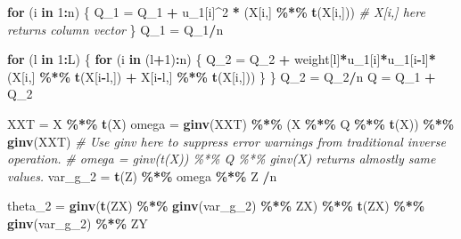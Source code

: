 \documentclass[
  12pt,
]{article}
\newenvironment{Shaded}{\begin{snugshade}}{\end{snugshade}}
\newcommand{\CommentTok}[1]{\textcolor[rgb]{0.56,0.35,0.01}{\textit{#1}}}
\newcommand{\ControlFlowTok}[1]{\textcolor[rgb]{0.13,0.29,0.53}{\textbf{#1}}}
\newcommand{\DecValTok}[1]{\textcolor[rgb]{0.00,0.00,0.81}{#1}}
\newcommand{\KeywordTok}[1]{\textcolor[rgb]{0.13,0.29,0.53}{\textbf{#1}}}
\newcommand{\NormalTok}[1]{#1}
\newcommand{\OperatorTok}[1]{\textcolor[rgb]{0.81,0.36,0.00}{\textbf{#1}}}
\newcommand{\StringTok}[1]{\textcolor[rgb]{0.31,0.60,0.02}{#1}}
\begin{document}
\begin{Shaded}
\begin{Highlighting}[]
\ControlFlowTok{for}\NormalTok{ (i }\ControlFlowTok{in} \DecValTok{1}\OperatorTok{:}\NormalTok{n) \{}
\NormalTok{    Q\_}\DecValTok{1}\NormalTok{ =}\StringTok{ }\NormalTok{Q\_}\DecValTok{1} \OperatorTok{+}\StringTok{ }\NormalTok{u\_}\DecValTok{1}\NormalTok{[i]}\OperatorTok{\^{}}\DecValTok{2} \OperatorTok{*}\StringTok{ }\NormalTok{(X[i,] }\OperatorTok{\%*\%}\StringTok{ }\KeywordTok{t}\NormalTok{(X[i,])) }\CommentTok{\# X[i,] here returns column vector}
\NormalTok{\}}
\NormalTok{Q\_}\DecValTok{1}\NormalTok{ =}\StringTok{ }\NormalTok{Q\_}\DecValTok{1}\OperatorTok{/}\NormalTok{n}

\ControlFlowTok{for}\NormalTok{ (l }\ControlFlowTok{in} \DecValTok{1}\OperatorTok{:}\NormalTok{L) \{}
    \ControlFlowTok{for}\NormalTok{ (i }\ControlFlowTok{in}\NormalTok{ (l}\OperatorTok{+}\DecValTok{1}\NormalTok{)}\OperatorTok{:}\NormalTok{n) \{}
\NormalTok{        Q\_}\DecValTok{2}\NormalTok{ =}\StringTok{ }\NormalTok{Q\_}\DecValTok{2} \OperatorTok{+}\StringTok{ }\NormalTok{weight[l]}\OperatorTok{*}\NormalTok{u\_}\DecValTok{1}\NormalTok{[i]}\OperatorTok{*}\NormalTok{u\_}\DecValTok{1}\NormalTok{[i}\OperatorTok{{-}}\NormalTok{l]}\OperatorTok{*}
\StringTok{        }\NormalTok{(X[i,] }\OperatorTok{\%*\%}\StringTok{ }\KeywordTok{t}\NormalTok{(X[i}\OperatorTok{{-}}\NormalTok{l,]) }\OperatorTok{+}\StringTok{ }\NormalTok{X[i}\OperatorTok{{-}}\NormalTok{l,] }\OperatorTok{\%*\%}\StringTok{ }\KeywordTok{t}\NormalTok{(X[i,]))}
\NormalTok{    \}}
\NormalTok{\}}
\NormalTok{Q\_}\DecValTok{2}\NormalTok{ =}\StringTok{ }\NormalTok{Q\_}\DecValTok{2}\OperatorTok{/}\NormalTok{n}
\NormalTok{Q =}\StringTok{ }\NormalTok{Q\_}\DecValTok{1} \OperatorTok{+}\StringTok{ }\NormalTok{Q\_}\DecValTok{2}

\NormalTok{XXT =}\StringTok{ }\NormalTok{X }\OperatorTok{\%*\%}\StringTok{ }\KeywordTok{t}\NormalTok{(X)}
\NormalTok{omega =}\StringTok{ }\KeywordTok{ginv}\NormalTok{(XXT) }\OperatorTok{\%*\%}\StringTok{ }\NormalTok{(X }\OperatorTok{\%*\%}\StringTok{ }\NormalTok{Q }\OperatorTok{\%*\%}\StringTok{ }\KeywordTok{t}\NormalTok{(X)) }\OperatorTok{\%*\%}\StringTok{ }\KeywordTok{ginv}\NormalTok{(XXT)}
\CommentTok{\# Use ginv here to suppress error warnings from traditional inverse operation.}
\CommentTok{\# omega = ginv(t(X)) \%*\% Q \%*\% ginv(X) returns almostly same values.}
\NormalTok{var\_g\_}\DecValTok{2}\NormalTok{ =}\StringTok{ }\KeywordTok{t}\NormalTok{(Z) }\OperatorTok{\%*\%}\StringTok{ }\NormalTok{omega }\OperatorTok{\%*\%}\StringTok{ }\NormalTok{Z }\OperatorTok{/}\NormalTok{n}

\NormalTok{theta\_}\DecValTok{2}\NormalTok{ =}\StringTok{ }\KeywordTok{ginv}\NormalTok{(}\KeywordTok{t}\NormalTok{(ZX) }\OperatorTok{\%*\%}\StringTok{ }\KeywordTok{ginv}\NormalTok{(var\_g\_}\DecValTok{2}\NormalTok{) }\OperatorTok{\%*\%}\StringTok{ }\NormalTok{ZX) }\OperatorTok{\%*\%}\StringTok{ }
\KeywordTok{t}\NormalTok{(ZX) }\OperatorTok{\%*\%}\StringTok{ }\KeywordTok{ginv}\NormalTok{(var\_g\_}\DecValTok{2}\NormalTok{) }\OperatorTok{\%*\%}\StringTok{ }\NormalTok{ZY}


\end{Highlighting}
\end{Shaded}
\end{document}
